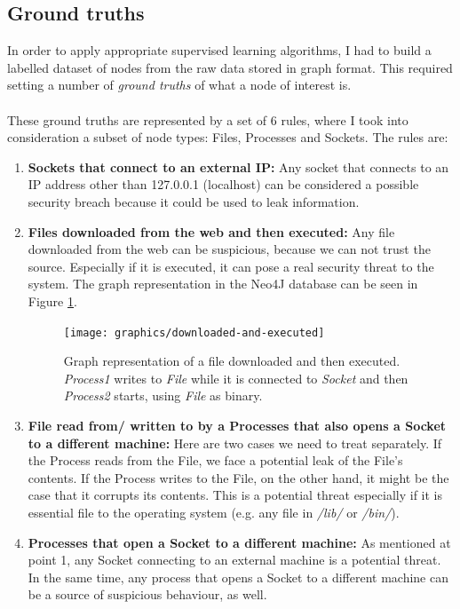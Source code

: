 	\subsection{Ground truths} \label{Section: prep/data/ground-truths}
	In order to apply appropriate supervised learning algorithms, I had to build a labelled dataset of nodes from the raw data stored in graph format. This required setting a number of \textit{ground truths} of what a node of interest is. 
	\\ \\
	These ground truths are represented by a set of 6 rules, where I took into consideration a subset of node types: Files, Processes and Sockets. The rules are:
	\begin{enumerate}
		
		\item \textbf{Sockets that connect to an external IP: }Any socket that connects to an IP address other than 127.0.0.1 (localhost) can be considered a possible security breach because it could be used to leak information.
		
		\item \textbf{Files downloaded from the web and then executed: }Any file downloaded from the web can be suspicious, because we can not trust the source. Especially if it is executed, it can pose a real security threat to the system. The graph representation in the Neo4J database can be seen in Figure \ref{Figure 2.3}.
		\begin{figure}[H]
			\centering
			\texttt{[image: graphics/downloaded-and-executed]}
			\caption[Graph representation of a file downloaded and then executed]{Graph representation of a file downloaded and then executed. \textit{Process1} writes to \textit{File} while it is connected to \textit{Socket} and then \textit{Process2} starts, using \textit{File} as binary.}
			\label{Figure 2.3}
		\end{figure}

		
		\item \textbf{File read from/ written to by a Processes that also opens a Socket to a different machine: }Here are two cases we need to treat separately. If the Process reads from the File, we face a potential leak of the File's contents. If the Process writes to the File, on the other hand, it might be the case that it corrupts its contents. This is a potential threat especially if it is essential file to the operating system (e.g. any file in \textit{/lib/} or \textit{/bin/}). 
		
		\item \textbf{Processes that open a Socket to a different machine: }As mentioned at point 1, any Socket connecting to an external machine is a potential threat. In the same time, any process that opens a Socket to a different machine can be a source of suspicious behaviour, as well. 
		

\end{enumerate}
